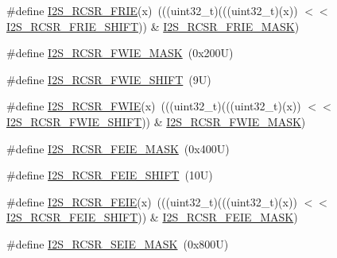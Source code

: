 \begin{DoxyCompactItemize}
\item 
\#define \mbox{\hyperlink{group___i2_s___register___masks_gab7498183d0dea3664abba6bff62103d5}{I2\+S\+\_\+\+R\+C\+S\+R\+\_\+\+F\+R\+IE}}(x)~(((uint32\+\_\+t)(((uint32\+\_\+t)(x)) $<$$<$ \mbox{\hyperlink{group___i2_s___register___masks_ga4f7d0729441e65e811ddbcf701db7692}{I2\+S\+\_\+\+R\+C\+S\+R\+\_\+\+F\+R\+I\+E\+\_\+\+S\+H\+I\+FT}})) \& \mbox{\hyperlink{group___i2_s___register___masks_ga97cd414600a5d5077af214ef0c166dc0}{I2\+S\+\_\+\+R\+C\+S\+R\+\_\+\+F\+R\+I\+E\+\_\+\+M\+A\+SK}})
\item 
\#define \mbox{\hyperlink{group___i2_s___register___masks_ga220d8d29a1d3adbf9b2e25b2a0e43fa7}{I2\+S\+\_\+\+R\+C\+S\+R\+\_\+\+F\+W\+I\+E\+\_\+\+M\+A\+SK}}~(0x200\+U)
\item 
\#define \mbox{\hyperlink{group___i2_s___register___masks_ga95d98fa004363d636a9d0496cb02772c}{I2\+S\+\_\+\+R\+C\+S\+R\+\_\+\+F\+W\+I\+E\+\_\+\+S\+H\+I\+FT}}~(9\+U)
\item 
\#define \mbox{\hyperlink{group___i2_s___register___masks_gad498425ee81dec130c3354dde24be894}{I2\+S\+\_\+\+R\+C\+S\+R\+\_\+\+F\+W\+IE}}(x)~(((uint32\+\_\+t)(((uint32\+\_\+t)(x)) $<$$<$ \mbox{\hyperlink{group___i2_s___register___masks_ga95d98fa004363d636a9d0496cb02772c}{I2\+S\+\_\+\+R\+C\+S\+R\+\_\+\+F\+W\+I\+E\+\_\+\+S\+H\+I\+FT}})) \& \mbox{\hyperlink{group___i2_s___register___masks_ga220d8d29a1d3adbf9b2e25b2a0e43fa7}{I2\+S\+\_\+\+R\+C\+S\+R\+\_\+\+F\+W\+I\+E\+\_\+\+M\+A\+SK}})
\item 
\#define \mbox{\hyperlink{group___i2_s___register___masks_ga52dba3c878ec84f736d69a57424783f8}{I2\+S\+\_\+\+R\+C\+S\+R\+\_\+\+F\+E\+I\+E\+\_\+\+M\+A\+SK}}~(0x400\+U)
\item 
\#define \mbox{\hyperlink{group___i2_s___register___masks_ga60c8463f4f1e02e0a0b66e3fcaf4a305}{I2\+S\+\_\+\+R\+C\+S\+R\+\_\+\+F\+E\+I\+E\+\_\+\+S\+H\+I\+FT}}~(10\+U)
\item 
\#define \mbox{\hyperlink{group___i2_s___register___masks_ga371029dc122e68d6de26a1c9aa824456}{I2\+S\+\_\+\+R\+C\+S\+R\+\_\+\+F\+E\+IE}}(x)~(((uint32\+\_\+t)(((uint32\+\_\+t)(x)) $<$$<$ \mbox{\hyperlink{group___i2_s___register___masks_ga60c8463f4f1e02e0a0b66e3fcaf4a305}{I2\+S\+\_\+\+R\+C\+S\+R\+\_\+\+F\+E\+I\+E\+\_\+\+S\+H\+I\+FT}})) \& \mbox{\hyperlink{group___i2_s___register___masks_ga52dba3c878ec84f736d69a57424783f8}{I2\+S\+\_\+\+R\+C\+S\+R\+\_\+\+F\+E\+I\+E\+\_\+\+M\+A\+SK}})
\item 
\#define \mbox{\hyperlink{group___i2_s___register___masks_gadc833e7868c81ddd83a8f22dc03818f2}{I2\+S\+\_\+\+R\+C\+S\+R\+\_\+\+S\+E\+I\+E\+\_\+\+M\+A\+SK}}~(0x800\+U)
$$
\end{DoxyCompactItemize}
